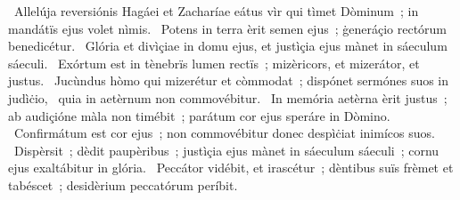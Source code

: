 {~Allelúja reversiónis Hagáei et Zacharíae}
{%
eátus vìr qui tìmet Dòminum~; in mandátïs ejus volet nìmis.
~Potens in terra èrit semen ejus~; ġeneráçio rectórum benedicétur.
~Glória et divìçiae in domu ejus, et justìçia ejus mànet in sáeculum sáeculi.
~Exórtum est in tènebrïs lumen rectïs~; mizèricors, et mizerátor, et justus.
~Jucùndus hòmo qui mizerétur et còmmodat~; dispónet sermónes suos in judìċio,
~quia in aetèrnum non commovébitur.
~In memória aetèrna èrit justus~; ab audiçióne màla non timébit~; parátum cor ejus speráre in Dòmino.
~Confirmátum est cor ejus~; non commovébitur donec despìċiat inimícos suos.
~Dispèrsit~; dèdit paupèribus~; justìçia ejus mànet in sáeculum sáeculi~; cornu ejus exaltábitur in glória.
~Peccátor vidébit, et irascétur~; dèntibus suïs frèmet et tabéscet~; desidèrium peccatórum períbit.
}
